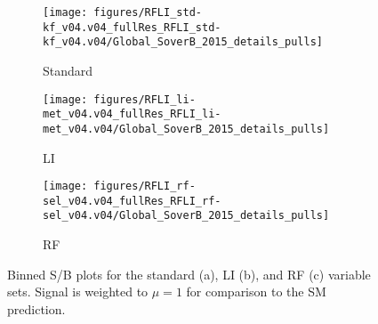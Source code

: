 \begin{figure}[!htbp]\captionsetup{justification=centering}
  \centering
\begin{subfigure}[t]{0.490000\textwidth}\centering\texttt{[image: figures/RFLI\_std-kf\_v04.v04\_fullRes\_RFLI\_std-kf\_v04.v04/Global\_SoverB\_2015\_details\_pulls]}\caption{Standard}\end{subfigure}
\begin{subfigure}[t]{0.490000\textwidth}\centering\texttt{[image: figures/RFLI\_li-met\_v04.v04\_fullRes\_RFLI\_li-met\_v04.v04/Global\_SoverB\_2015\_details\_pulls]}\caption{LI}\end{subfigure}
\begin{subfigure}[t]{0.490000\textwidth}\centering\texttt{[image: figures/RFLI\_rf-sel\_v04.v04\_fullRes\_RFLI\_rf-sel\_v04.v04/Global\_SoverB\_2015\_details\_pulls]}\caption{RF}\end{subfigure}
    \caption{Binned S/B plots for the standard (a), LI (b), and RF (c) variable sets.  Signal is weighted to $\mu=1$ for comparison to the SM prediction.}
    \label{fig:SoB}
\end{figure}

